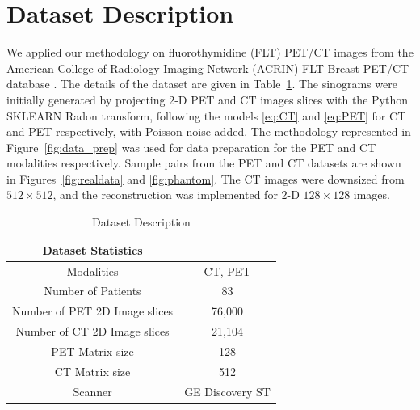 \section{Dataset Description}
We applied our methodology on fluorothymidine (FLT) PET/CT images from the American College of Radiology Imaging Network (ACRIN) FLT Breast \ac{PET}/\ac{CT} database \cite{kostakoglu2015phase}. The details of the dataset are given in Table~\ref{table:2}. The sinograms were initially generated by projecting 2-D \ac{PET} and \ac{CT} images slices with the Python SKLEARN Radon transform, following the models \eqref{eq:CT} and \eqref{eq:PET} for \ac{CT} and \ac{PET} respectively, with Poisson noise added. 
The methodology represented in Figure~\ref{fig:data_prep} was used for data preparation for the \ac{PET} and \ac{CT} modalities respectively. Sample pairs from the \ac{PET} and \ac{CT} datasets are shown in Figures~\ref{fig:realdata} and \ref{fig:phantom}. The \ac{CT} images were downsized from $512\times{}512$, and the reconstruction was implemented for 2-D $128\times{}128$ images.

\begin{table}[h!]
	\caption{Dataset Description}
	\label{table:2}
	\centering
	\begin{tabular}{||c|c||} 
		\hline
		Dataset Statistics &  \\ [0.5ex] 
		\hline
		Modalities & CT, PET   \\ 
		\hline
		Number of Patients  & 83  \\
		\hline
		Number of \ac{PET} \ac{2D} Image slices & 76,000 \\ 
		\hline
		Number of CT \ac{2D} Image slices & 21,104 \\ 
		\hline
		PET Matrix size & 128 \\ 
		\hline
		CT Matrix size & 512 \\ 
		\hline
		Scanner & GE Discovery ST \\
		\hline
	\end{tabular}
	
\end{table}

